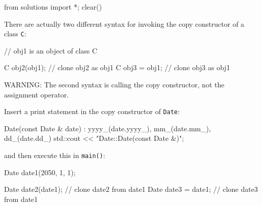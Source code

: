 \begin{python0}
from solutions import *; clear()
\end{python0}

There are actually two different syntax for invoking the copy
constructor of a class \texttt{C}:

\begin{consolethree}[escapeinside=||]
// obj1 is an object of class C

C obj2(obj1); // clone obj2 as obj1
C obj3 = obj1; // clone obj3 as obj1
\end{consolethree}

WARNING: The second syntax is calling the copy constructor, not the
assignment operator.

 Insert a print statement in the copy constructor of
\texttt{Date}:

\begin{consolethree}[escapeinside=||]
Date(const Date & date)
    : yyyy_(date.yyyy_), mm_(date.mm_), dd_(date.dd_)
{
    std::cout << "Date::Date(const Date &)\n";
}
\end{consolethree}

and then execute this in \texttt{main()}:

\begin{consolethree}[escapeinside=||]
Date date1(2050, 1, 1);

Date date2(date1);  // clone date2 from date1
Date date3 = date1; // clone date3 from date1
\end{consolethree}


